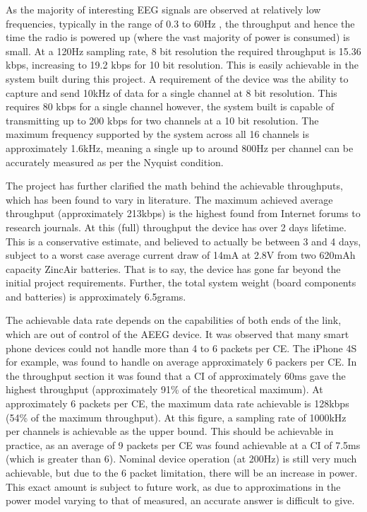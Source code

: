 \documentclass[]{article}
\begin{document}
As the majority of interesting \ac{EEG} signals are observed at relatively low frequencies, typically in the range of 0.3 to 60Hz \cite{eeeman}, the throughput and hence the time the radio is powered up (where the vast majority of power is consumed) is small. At a 120Hz sampling rate, 8 bit resolution the required throughput is 15.36 kbps, increasing to 19.2 kbps for 10 bit resolution. This is easily achievable in the system built during this project. A requirement of the device was the ability to capture and send 10kHz of data for a single channel at 8 bit resolution. This requires 80 kbps for a single channel however, the system built is capable of transmitting up to 200 kbps for two channels at a 10 bit resolution. The maximum frequency supported by the system across all 16 channels is approximately 1.6kHz, meaning a single up to around 800Hz per channel can be accurately measured as per the Nyquist condition. 

The project has further clarified the math behind the achievable throughputs, which has been found to vary in literature. The maximum achieved average throughput (approximately 213kbps) is the highest found from Internet forums to research journals. At this (full) throughput the device has over 2 days lifetime. This is a conservative estimate, and believed to actually be between 3 and 4 days, subject to a worst case average current draw of 14mA at 2.8V from two 620mAh capacity ZincAir batteries. That is to say, the device has gone far beyond the initial project requirements. Further, the total system weight (board components and batteries) is approximately 6.5grams.

The achievable data rate depends on the capabilities of both ends of the link, which are out of control of the \ac{AEEG} device. It was observed that many smart phone devices could not handle more than 4 to 6 packets per \ac{CE}. The iPhone 4S for example, was found to handle on average approximately 6 packers per \ac{CE}. In the throughput section it was found that a \ac{CI} of approximately 60ms gave the highest throughput (approximately 91\% of the theoretical maximum). At approximately 6 packets per \ac{CE}, the maximum data rate achievable is 128kbps (54\% of the maximum throughput). At this figure, a sampling rate of 1000kHz per channels is achievable as the upper bound. This should be achievable in practice, as an average of 9 packets per \ac{CE} was found achievable at a \ac{CI} of 7.5ms (which is greater than 6). Nominal device operation (at 200Hz) is still very much achievable, but due to the 6 packet limitation, there will be an increase in power. This exact amount is subject to future work, as due to approximations in the power model varying to that of measured, an accurate answer is difficult to give.
\end{document}
